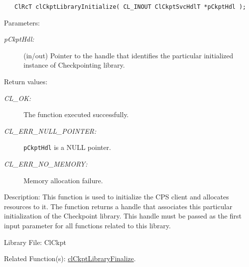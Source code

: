 \begin{flushleft}
\begin{Desc}
\footnotesize\begin{verbatim}  	ClRcT clCkptLibraryInitialize( CL_INOUT ClCkptSvcHdlT *pCkptHdl ); 
\end{verbatim}
\normalsize
\end{Desc}
\begin{Desc}
\item[Parameters:]
\begin{description}
\item[{\em pCkptHdl:}](in/out) Pointer to the handle that identifies the particular initialized instance of Checkpointing library. 
\end{description}
\end{Desc}
\begin{Desc}
\item[Return values:]
\begin{description}
\item[{\em CL\_\-OK:}]The function executed successfully.
\item[{\em CL\_\-ERR\_\-NULL\_\-POINTER:}] {\tt{pCkptHdl}} is a NULL pointer.
\item[{\em CL\_\-ERR\_\-NO\_\-MEMORY:}] Memory allocation failure.
\end{description}
\end{Desc}
\begin{Desc}
\item[Description:]This function is used to initialize the CPS client and allocates resources to it. The function returns a handle that associates this 
particular initialization of the Checkpoint library. This handle must be passed as the first input parameter for all functions related to 
this library. 
\end{Desc}
\begin{Desc}
\item[Library File:]Cl\-Ckpt\end{Desc}
\begin{Desc}
\item[Related Function(s):]\hyperlink{pageckpt102}{cl\-Ckpt\-Library\-Finalize}. \end{Desc}

\newpage





\end{flushleft}
